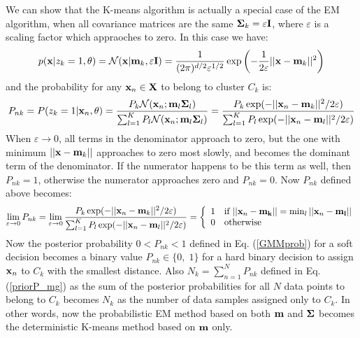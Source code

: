 \documentclass{article}
\begin{document}
We can show that the K-means algorithm is actually a special case 
of the EM algorithm, when all covariance matrices are the same
${\bf\Sigma}_k=\varepsilon{\bf I}$, where $\varepsilon$ is a 
scaling factor which appraoches to zero. In this case we have:
\begin{equation}
  p({\bf x}|z_k=1,\theta)={\cal N}({\bf x}|{\bf m}_k,\varepsilon{\bf I})
  =\frac{1}{(2\pi)^{d/2}\varepsilon^{1/2}}
  \exp\left(-\frac{1}{2\varepsilon}||{\bf x}-{\bf m}_k||^2\right)
\end{equation}
and the probability for any ${\bf x}_n\in{\bf X}$ to belong to cluster 
$C_k$ is:
\begin{equation}
  P_{nk}=P(z_k=1|{\bf x}_n,\theta)
  =\frac{P_k{\cal N}({\bf x}_n;{\bf m}_l{\bf\Sigma}_l)}
  {\sum_{l=1}^K P_l {\cal N}({\bf x}_n;{\bf m}_l{\bf\Sigma}_l)}
  =\frac{P_k\exp(-||{\bf x}_n-{\bf m}_k||^2/2\varepsilon)}
  {\sum_{l=1}^K P_l\exp(-||{\bf x}_n-{\bf m}_l||^2/2\varepsilon)}
\end{equation}
When $\varepsilon\rightarrow 0$, all terms in the denominator approach
to zero, but the one with minimum $||{\bf x}-{\bf m}_k||$ approaches 
to zero most slowly, and becomes the dominant term of the denominator.
If the numerator happens to be this term as well, then $P_{nk}=1$,
otherwise the numerator approaches zero and $P_{nk}=0$. Now $P_{nk}$ 
defined above becomes:
\begin{equation}
  \lim\limits_{\varepsilon\rightarrow 0} P_{nk}=\lim\limits_{\varepsilon\rightarrow 0} 
  \frac{P_k\exp(-||{\bf x}_n-{\bf m}_k||^2/2\varepsilon)}
  {\sum_{l=1}^K P_l\exp(-||{\bf x}_n-{\bf m}_l||^2/2\varepsilon)}
  =\left\{\begin{array}{ll}
  1 & \mbox{if $||{\bf x}_n-{\bf m_k}||=\min_l ||{\bf x}_n-{\bf m_l}|$}|\\
  0 & \mbox{otherwise}\end{array}\right.
\end{equation}
Now the posterior probability $0<P_{nk}<1$ defined in Eq. 
(\ref{GMMprob}) for a soft decision becomes a binary value 
$P_{nk}\in\{0,\;1\}$ for a hard binary decision to assign 
${\bf x}_n$ to $C_k$ with the smallest distance. Also 
$N_k=\sum_{n=1}^N P_{nk}$ defined in Eq. (\ref{priorP_mg})
as the sum of the posterior probabilities for all $N$ data 
points to belong to $C_k$ becomes $N_k$ as the number of 
data samples assigned only to $C_k$. In other words, now 
the probabilistic EM method based on both ${\bf m}$ and 
${\bf\Sigma}$ becomes the deterministic K-means method based 
on ${\bf m}$ only.
\end{document}
